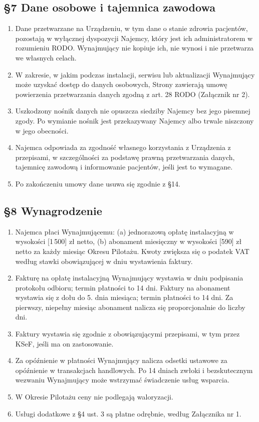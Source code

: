 \documentclass[11pt,a4paper]{article}
\begin{document}
\subsection*{§7 Dane osobowe i tajemnica zawodowa}
\begin{enumerate}
\item Dane przetwarzane na Urządzeniu, w tym dane o stanie zdrowia pacjentów, pozostają w wyłącznej dyspozycji Najemcy, który jest ich administratorem w rozumieniu RODO. Wynajmujący nie kopiuje ich, nie wynosi i nie przetwarza we własnych celach.
\item W zakresie, w jakim podczas instalacji, serwisu lub aktualizacji Wynajmujący może uzyskać dostęp do danych osobowych, Strony zawierają umowę powierzenia przetwarzania danych zgodną z art. 28 RODO (Załącznik nr 2).
\item Uszkodzony nośnik danych nie opuszcza siedziby Najemcy bez jego pisemnej zgody. Po wymianie nośnik jest przekazywany Najemcy albo trwale niszczony w jego obecności.
\item Najemca odpowiada za zgodność własnego korzystania z Urządzenia z przepisami, w szczególności za podstawę prawną przetwarzania danych, tajemnicę zawodową i informowanie pacjentów, jeśli jest to wymagane.
\item Po zakończeniu umowy dane usuwa się zgodnie z §14.
\end{enumerate}

\subsection*{§8 Wynagrodzenie}
\begin{enumerate}
\item Najemca płaci Wynajmującemu: (a) jednorazową opłatę instalacyjną w wysokości [1\,500] zł netto, (b) abonament miesięczny w wysokości [590] zł netto za każdy miesiąc Okresu Pilotażu. Kwoty zwiększa się o podatek VAT według stawki obowiązującej w dniu wystawienia faktury.
\item Fakturę na opłatę instalacyjną Wynajmujący wystawia w dniu podpisania protokołu odbioru; termin płatności to 14 dni. Faktury na abonament wystawia się z dołu do 5. dnia miesiąca; termin płatności to 14 dni. Za pierwszy, niepełny miesiąc abonament nalicza się proporcjonalnie do liczby dni.
\item Faktury wystawia się zgodnie z obowiązującymi przepisami, w tym przez KSeF, jeśli ma on zastosowanie.
\item Za opóźnienie w płatności Wynajmujący nalicza odsetki ustawowe za opóźnienie w transakcjach handlowych. Po 14 dniach zwłoki i bezskutecznym wezwaniu Wynajmujący może wstrzymać świadczenie usług wsparcia.
\item W Okresie Pilotażu ceny nie podlegają waloryzacji.
\item Usługi dodatkowe z §4 ust. 3 są płatne odrębnie, według Załącznika nr 1.
\end{enumerate}
\end{document}
